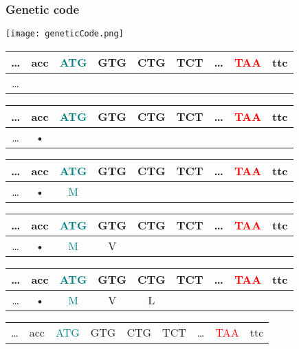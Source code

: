 \documentclass{beamer}
\begin{document}
\begin{frame}
\frametitle{Genetic code}
\centering
	\texttt{[image: geneticCode.png]}
\vspace{10pt}
\begin{overprint}
	\centering
	\begin{tabular}{|c|c|c|c|c|c|c|c|c|}
		\hline 
		\ldots & acc & \textcolor{teal}{ATG} & GTG & CTG & TCT & \ldots & \textcolor{red}{TAA} & ttc \\ 
		\hline 
		\ldots &  &  &  &  &  &  &  &  \\ 
		\hline 
	\end{tabular}	
	\centering
	\begin{tabular}{|c|c|c|c|c|c|c|c|c|}
		\hline 
		\ldots & acc & \textcolor{teal}{ATG} & GTG & CTG & TCT & \ldots & \textcolor{red}{TAA} & ttc \\ 
		\hline 
		\ldots & • &  &  &  &  &  &  &  \\ 
		\hline 
	\end{tabular}
	\centering
	\begin{tabular}{|c|c|c|c|c|c|c|c|c|}
		\hline 
		\ldots & acc & \textcolor{teal}{ATG} & GTG & CTG & TCT & \ldots & \textcolor{red}{TAA} & ttc \\ 
		\hline 
		\ldots & • & \textcolor{teal}{M} &  &  &  &  &  &  \\ 
		\hline 
	\end{tabular}
	\centering
	\begin{tabular}{|c|c|c|c|c|c|c|c|c|}
		\hline 
		\ldots & acc & \textcolor{teal}{ATG} & GTG & CTG & TCT & \ldots & \textcolor{red}{TAA} & ttc \\ 
		\hline 
		\ldots & • & \textcolor{teal}{M} & V &  &  &  &  &  \\ 
		\hline 
	\end{tabular}
	\centering
	\begin{tabular}{|c|c|c|c|c|c|c|c|c|}
		\hline 
		\ldots & acc & \textcolor{teal}{ATG} & GTG & CTG & TCT & \ldots & \textcolor{red}{TAA} & ttc \\ 
		\hline 
		\ldots & • & \textcolor{teal}{M} & V & L &  &  &  &  \\ 
		\hline 
	\end{tabular}
	\centering
	\begin{tabular}{|c|c|c|c|c|c|c|c|c|}
		\hline 
		\ldots & acc & \textcolor{teal}{ATG} & GTG & CTG & TCT & \ldots & \textcolor{red}{TAA} & ttc \\ 

\end{tabular}
\end{overprint}
\end{frame}
\end{document}
